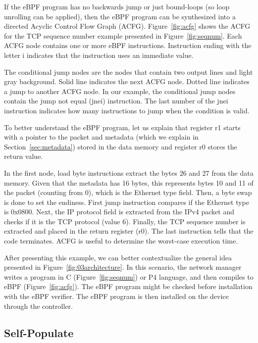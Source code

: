 If the eBPF program has no backwards jump or just bound-loops (so loop unrolling can be applied), then the eBPF program can be synthesized into a directed Acyclic Control Flow Graph (ACFG). 
Figure~\ref{fig:acfg} shows the ACFG for the TCP sequence number example presented in Figure~\ref{fig:seqnum}. Each ACFG node contains one or more eBPF instructions. Instruction ending with the letter i indicates that the instruction uses an immediate value.

The conditional jump nodes are the nodes that contain two output lines and light gray background.
Solid line indicates the next ACFG node. Dotted line indicates a jump to another ACFG node.
In our example, the conditional jump nodes contain the jump not equal (jnei) instruction.
The last number of the jnei instruction indicates how many instructions to jump when the condition is valid.

To better understand the eBPF program, let us explain that register r1 starts with a pointer to the packet and metadata (which we explain in Section~\ref{sec:metadata}) stored in the data memory and register r0 stores the return value.

In the first node, load byte instructions extract the bytes 26 and 27 from the data memory.
Given that the metadata has 16 bytes, this represents bytes 10 and 11 of the packet (counting from 0), which is the Ethernet type field. Then, a byte swap is done to set the endiness. 
First jump instruction compares if the Ethernet type is 0x0800. Next, the IP protocol field is extracted from the IPv4 packet and checks if it is the TCP protocol (value 6). Finally, the TCP sequence number is extracted and placed in the return register (r0). The last instruction tells that the code terminates.
ACFG is useful to determine the worst-case execution time.




After presenting this example, we can better contextualize the general idea presented in  Figure~\ref{fig:03architecture}. In this scenario, the network manager writes a program in C (Figure~\ref{fig:seqnum}) or P4 language, and then compiles to eBPF (Figure~\ref{fig:acfg}). The eBPF program might be checked before installation with the eBPF verifier. The eBPF program is then installed on the device through the controller.


\subsection{Self-Populate}
\label{sec:selfpopulate}

